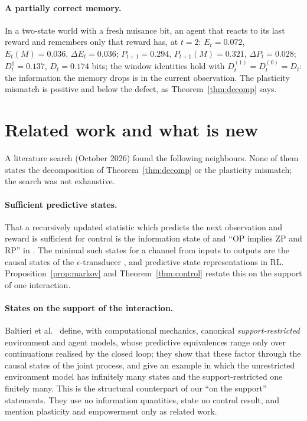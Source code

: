 \documentclass[11pt]{article}
\theoremstyle{plain}
\theoremstyle{definition}
\theoremstyle{remark}
\newcommand{\dE}{\Delta E}
\newcommand{\dP}{\Delta P}
\begin{document}
\paragraph{A partially correct memory.} In a two-state world with a fresh nuisance bit, an agent that reacts to its last reward and remembers only that reward has, at $t = 2$: $E_t = 0.072$, $E_t(M) = 0.036$, $\dE_t = 0.036$; $P_{t+1} = 0.294$, $P_{t+1}(M) = 0.321$, $\dP_t = 0.028$; $D^0_t = 0.137$, $D_t = 0.174$ bits; the window identities hold with $D^{(1)}_t = D^{(0)}_t = D_t$: the information the memory drops is in the current observation. The plasticity mismatch is positive and below the defect, as Theorem~\ref{thm:decomp} says.

\section{Related work and what is new}\label{app:related}
A literature search (October 2026) found the following neighbours. None of them states the decomposition of Theorem~\ref{thm:decomp} or the plasticity mismatch; the search was not exhaustive.

\paragraph{Sufficient predictive states.} That a recursively updated statistic which predicts the next observation and reward is sufficient for control is the information state of \cite{subramanian2022approximate} and ``OP implies ZP and RP'' in \cite{ni2024bridging}. The minimal such states for a channel from inputs to outputs are the causal states of the $\epsilon$-transducer \cite{barnett2015computational}, and predictive state representations in RL. Proposition~\ref{prop:markov} and Theorem~\ref{thm:control} restate this on the support of one interaction.

\paragraph{States on the support of the interaction.} Baltieri et al.\ \cite{baltieri2026world} define, with computational mechanics, canonical \emph{support-restricted} environment and agent models, whose predictive equivalences range only over continuations realised by the closed loop; they show that these factor through the causal states of the joint process, and give an example in which the unrestricted environment model has infinitely many states and the support-restricted one finitely many. This is the structural counterpart of our ``on the support'' statements. They use no information quantities, state no control result, and mention plasticity and empowerment only as related work.
\end{document}

